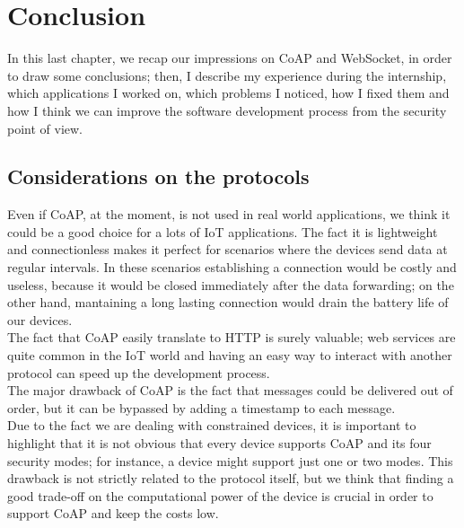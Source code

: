

\chapter{Conclusion}\label{ch:end}

In this last chapter, we recap our impressions on CoAP and WebSocket, in order to draw some conclusions; then, I describe my experience during the internship, which applications I worked on, which problems I noticed, how I fixed them and how I think we can improve the software development process from the security point of view.

\section{Considerations on the protocols}

Even if CoAP, at the moment, is not used in real world applications, we think it could be a good choice for a lots of IoT applications. The fact it is lightweight and connectionless makes it perfect for scenarios where the devices send data at
regular intervals. In these scenarios establishing a connection would be costly and useless, because it would be closed immediately after the data forwarding; on the other hand, mantaining a long lasting connection would drain the battery life of our devices.\\
The fact that CoAP easily translate to HTTP is surely valuable; web services are quite common in the IoT world and having
an easy way to interact with another protocol can speed up the development process.\\
The major drawback of CoAP is the fact that messages could be delivered out of order, but it can be bypassed by adding a 
timestamp to each message.\\
Due to the fact we are dealing with constrained devices, it is important to highlight that it is not obvious that every device
supports CoAP and its four security modes; for instance, a device might support just one or two modes. This drawback is not strictly related to the protocol itself, but we think that finding a good trade-off on the computational power of the device is crucial in order to support CoAP and keep the costs low.\\

